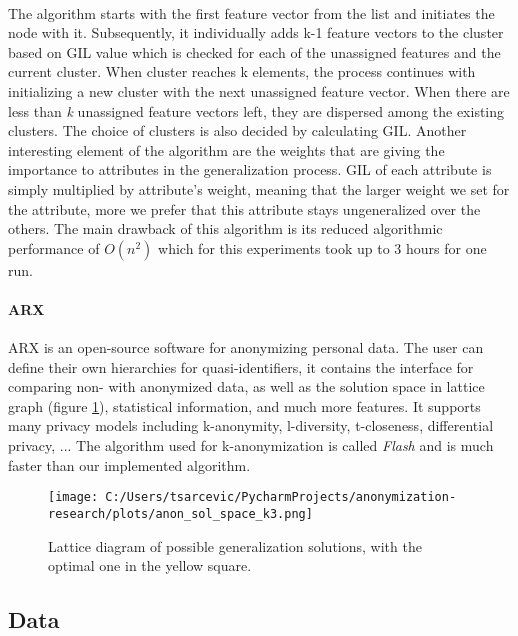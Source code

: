 \documentclass{article}
\begin{document}
\paragraph{}
The algorithm starts with the first feature vector from the list and initiates the node with it. Subsequently, it individually adds k-1 feature vectors to the cluster based on GIL value which is checked for each of the unassigned features and the current cluster. When cluster reaches k elements, the process continues with initializing a new cluster with the next unassigned feature vector. When there are less than \textit{k} unassigned feature vectors left, they are dispersed among the existing clusters. The choice of clusters is also decided by calculating GIL. 
Another interesting element of the algorithm are the weights that are giving the importance to attributes in the generalization process. GIL of each attribute is simply multiplied by attribute's weight, meaning that the larger weight we set for the attribute, more we prefer that this attribute stays ungeneralized over the others.
The main drawback of this algorithm is its reduced algorithmic performance of ${O(n^2)}$ which for this experiments took up to 3 hours for one run.

\paragraph{ARX}
ARX \cite{prasser2015putting} is an open-source software for anonymizing personal data. The user can define their own hierarchies for quasi-identifiers, it contains the interface for comparing non- with anonymized data, as well as the solution space in lattice graph (figure \ref{fig:lattice}), statistical information, and much more features. It supports many privacy models including k-anonymity, l-diversity, t-closeness, differential privacy, ... The algorithm used for k-anonymization is called \textit{Flash} \cite{kohlmayer2012flash} and is much faster than our implemented algorithm.

\begin{figure}
	\texttt{[image: C:/Users/tsarcevic/PycharmProjects/anonymization-research/plots/anon\_sol\_space\_k3.png]}
	\caption{Lattice diagram of possible generalization solutions, with the optimal one in the yellow square.}
 	\label{fig:lattice}
\end{figure}

\subsection{Data}
\end{document}
